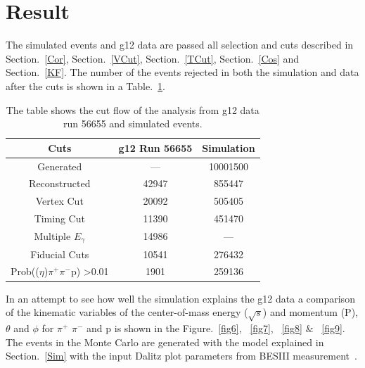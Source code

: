 \section{Result}

The simulated events and g12 data are passed all selection and cuts described in  Section.~\ref{Cor}, Section.~\ref{VCut}, Section.~\ref{TCut}, Section.~\ref{Cos} and Section.~\ref{KF}. The number of the events rejected in both the simulation and data after the cuts is shown in a Table.~\ref{tab3}. 
  
\begin{table}[]
\centering
\begin{tabular}{|c|c|c|}
\hline
Cuts                                        & g12 Run 56655                    & Simulation \\
\hline
Generated                               & ---                          & 10001500   \\
Reconstructed                           & 42947                        & 855447     \\
Vertex Cut                              & 20092                        & 505405     \\
Timing Cut                              & 11390                        & 451470     \\
Multiple $E_{\gamma}$ & 14986 & ---            \\
Fiducial Cuts                           & 10541                        & 276432     \\
Prob(($\eta$)$\pi^{+}$$\pi^{-}$p) \textgreater 0.01                & 1901                         & 259136    \\
\hline
\end{tabular}
\caption{The table shows the cut flow of the analysis from g12 data run 56655 and simulated events.}
\label{tab3}
\end{table}
 
 In an attempt to see how well the simulation explains the g12 data a comparison of the kinematic variables of the center-of-mass energy ($\sqrt{s}$) and momentum (P), $\theta$ and $\phi$ for $\pi^{+}$ $\pi^{-}$ and p is shown in the Figure.~\ref{fig6}, ~\ref{fig7}, ~\ref{fig8} $\&$ ~\ref{fig9}. The events in the Monte Carlo are generated with the model explained in Section.~\ref{Sim} with the input Dalitz plot parameters from BESIII measurement~\cite{Ablikim:2010kp}.

